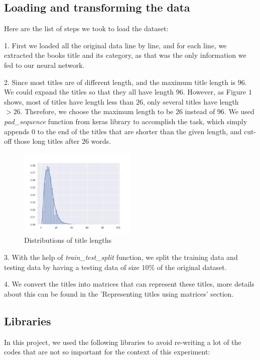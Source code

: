 \documentclass[jou,apacite, 10px]{apa6}
\begin{document}
\subsection{Loading and transforming the data}
Here are the list of steps we took to load the dataset:

\rule{0pt}{4ex}  1. First we loaded all the original data line by line, and for each line, we extracted the books title and its category, as that was the only information we fed to our neural network.

\rule{0pt}{4ex}  2. Since most titles are of different length, and the maximum title length is $96$. We could expand the titles so that they all have length $96$. However, as Figure $1$ shows, most of titles have length less than $26$, only several titles have length $>26$. Therefore, we choose the maximum length to be $26$ instead of $96$. We used \textit{pad\_sequence} function from keras library to accomplish the task, which simply appends $0$ to the end of the titles that are shorter than the given length, and cut-off those long titles after $26$ words.

\begin{figure}[h!]
\captionsetup{justification=centering}
     \includegraphics[width=0.5\textwidth]{images/title_lengths}
     \caption{Distributions of title lengths}
\end{figure}

\rule{0pt}{4ex}  3. With the help of \textit{train\_test\_split} function, we split the training data and testing data by having a testing data of size $10\%$ of the original dataset.

\rule{0pt}{4ex}  4. We convert the titles into matrices that can represent these titles, more details about this can be found in the 'Representing titles using matrices' section.

\subsection{Libraries}
In this project, we used the following libraries to avoid re-writing a lot of the codes that are not so important for the context of this experiment:
\end{document}
